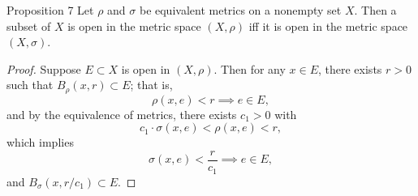 \begin{namedthm*}{Proposition 7}
    Let $\rho$ and $\sigma$ be equivalent metrics on a nonempty set $X$.
    Then a subset of $X$ is open in the metric space $(X,\rho)$ iff it is open in the metric space $(X,\sigma)$.
\end{namedthm*}
\begin{proof}
    Suppose $E\subset X$ is open in $(X,\rho)$.
    Then for any $x\in E$, there exists $r>0$ such that $B_\rho(x,r)\subset E$; that is,
    \[
        \rho(x,e)<r\implies e\in E,
    \]
    and by the equivalence of metrics, there exists $c_1>0$ with
    \[
        c_1\cdot\sigma(x,e)<\rho(x,e)<r,
    \]
    which implies
    \[
        \sigma(x,e)<\frac{r}{c_1}\implies e\in E,
    \]
    and $B_\sigma(x,r/c_1)\subset E$.
\end{proof}

